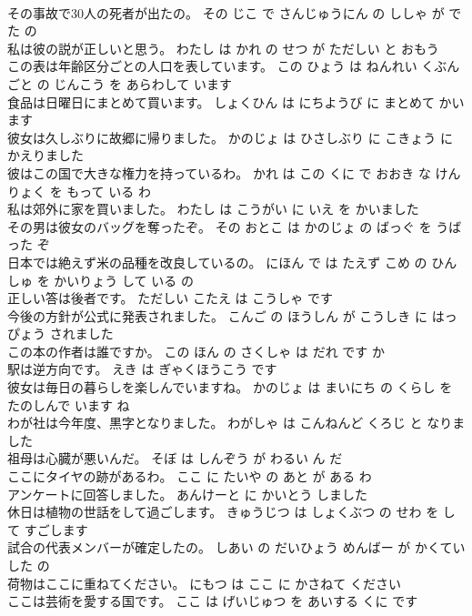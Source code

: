 \documentclass[8pt]{extreport}
\begin{document}
\begin{CJK}{UTF8}{min}
\\	その事故で30人の死者が出たの。	その じこ で さんじゅうにん の ししゃ が でた の 
\\	私は彼の説が正しいと思う。	わたし は かれ の せつ が ただしい と おもう 
\\	この表は年齢区分ごとの人口を表しています。	この ひょう は ねんれい くぶん ごと の じんこう を あらわして います 
\\	食品は日曜日にまとめて買います。	しょくひん は にちようび に まとめて かいます 
\\	彼女は久しぶりに故郷に帰りました。	かのじょ は ひさしぶり に こきょう に かえりました 
\\	彼はこの国で大きな権力を持っているわ。	かれ は この くに で おおき な けんりょく を もって いる わ 
\\	私は郊外に家を買いました。	わたし は こうがい に いえ を かいました 
\\	その男は彼女のバッグを奪ったぞ。	その おとこ は かのじょ の ばっぐ を うばった ぞ 
\\	日本では絶えず米の品種を改良しているの。	にほん で は たえず こめ の ひんしゅ を かいりょう して いる の 
\\	正しい答は後者です。	ただしい こたえ は こうしゃ です 
\\	今後の方針が公式に発表されました。	こんご の ほうしん が こうしき に はっぴょう されました 
\\	この本の作者は誰ですか。	この ほん の さくしゃ は だれ です か 
\\	駅は逆方向です。	えき は ぎゃくほうこう です 
\\	彼女は毎日の暮らしを楽しんでいますね。	かのじょ は まいにち の くらし を たのしんで います ね 
\\	わが社は今年度、黒字となりました。	わがしゃ は こんねんど くろじ と なりました 
\\	祖母は心臓が悪いんだ。	そぼ は しんぞう が わるい ん だ 
\\	ここにタイヤの跡があるわ。	ここ に たいや の あと が ある わ 
\\	アンケートに回答しました。	あんけーと に かいとう しました 
\\	休日は植物の世話をして過ごします。	きゅうじつ は しょくぶつ の せわ を して すごします 
\\	試合の代表メンバーが確定したの。	しあい の だいひょう めんばー が かくてい した の 
\\	荷物はここに重ねてください。	にもつ は ここ に かさねて ください 
\\	ここは芸術を愛する国です。	ここ は げいじゅつ を あいする くに です 

\end{CJK}
\end{document}
